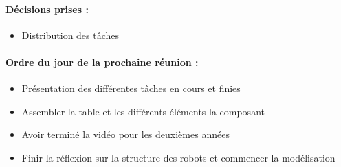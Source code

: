 \documentclass[12pt]{report}
\begin{document}
\paragraph{Décisions prises :}
\begin{itemize}
\item Distribution des tâches 
\end{itemize}

\paragraph{Ordre du jour de la prochaine réunion :}
\begin{itemize}
\item Présentation des différentes tâches en cours et finies
\item Assembler la table et les différents éléments la composant
\item Avoir terminé la vidéo pour les deuxièmes années
\item Finir la réflexion sur la structure des robots et commencer la modélisation
\end{itemize}
\end{document}

